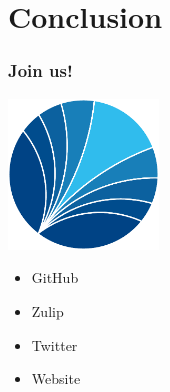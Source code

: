 \section{Conclusion}
\begin{frame}\frametitle{Join us!}\vspace{1.25cm}

  \begin{multicols}{2}

      \hspace{1.3cm}\includegraphics[width=0.30\textwidth]{material/ose-logo-no-type-rgb.pdf}


        \columnbreak


  \begin{itemize}\setlength\itemsep{1em}
    \item GitHub
    \item Zulip
    \item Twitter
    \item Website
  \end{itemize}\vspace{0.3cm}


      \end{multicols}

\end{frame}
